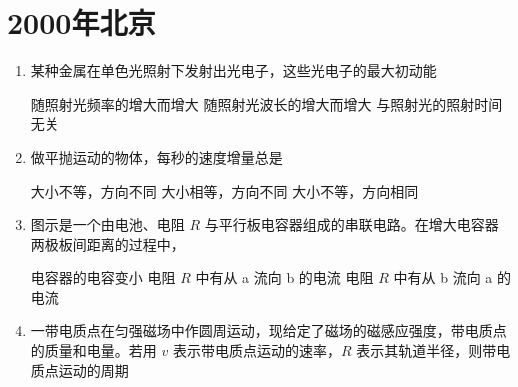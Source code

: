 \documentclass[\gkver]{gaokaozhenti}
\begin{document}
\chapter{2000年北京}

\begin{enumerate}
\item
某种金属在单色光照射下发射出光电子，这些光电子的最大初动能 

{随照射光频率的增大而增大}
{随照射光波长的增大而增大}
{与照射光的照射时间无关}


\item
做平抛运动的物体，每秒的速度增量总是 

{大小不等，方向不同}
{大小相等，方向不同}
{大小不等，方向相同}


\item
图示是一个由电池、电阻 $R$ 与平行板电容器组成的串联电路。在增大电容器两极板间距离的过程中，

{电容器的电容变小}
{电阻 $R$ 中有从 a 流向 b 的电流}
{电阻 $R$ 中有从 b 流向 a 的电流}


\item
一带电质点在匀强磁场中作圆周运动，现给定了磁场的磁感应强度，带电质点的质量和电量。若用 $v$ 表示带电质点运动的速率，$R$ 表示其轨道半径，则带电质点运动的周期 


\end{enumerate}
\end{document}
